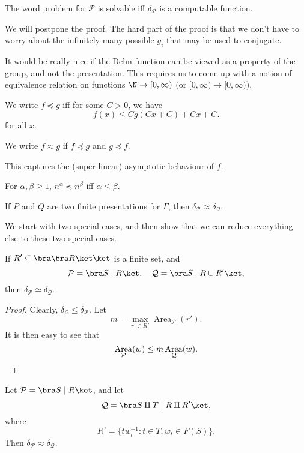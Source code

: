 \documentclass[a4paper]{article}
\DeclareMathOperator\Area{Area}
\begin{document}
\begin{prop}
  The word problem for $\mathcal{P}$ is solvable iff $\delta_{\mathcal{P}}$ is a computable function.
\end{prop}

We will postpone the proof. The hard part of the proof is that we don't have to worry about the infinitely many possible $g_i$ that may be used to conjugate.

It would be really nice if the Dehn function can be viewed as a property of the group, and not the presentation. This requires us to come up with a notion of equivalence relation on functions $\N \to [0, \infty)$ (or $[0, \infty) \to [0, \infty)$).

\begin{defi}[$\preccurlyeq$]\index{$\preccurlyeq$}
  We write $f \preccurlyeq g$ iff for some $C > 0$, we have
  \[
    f(x) \leq C g(Cx + C) + Cx + C.
  \]
  for all $x$.

  We write $f \approx g$ if $f \preccurlyeq g$ and $g \preccurlyeq f$.
\end{defi}
This captures the (super-linear) asymptotic behaviour of $f$.

\begin{eg}
  For $\alpha, \beta \geq 1$, $n^\alpha \preccurlyeq n^\beta$ iff $\alpha \leq \beta$.
\end{eg}

\begin{prop}
  If $P$ and $Q$ are two finite presentations for $\Gamma$, then $\delta_{\mathcal{P}} \approx \delta_{\mathcal{Q}}$.
\end{prop}

We start with two special cases, and then show that we can reduce everything else to these two special cases.
\begin{lemma}
  If $R' \subseteq \bra \bra R \ket \ket$ is a finite set, and
  \[
    \mathcal{P} = \bra S \mid R \ket,\quad \mathcal{Q} = \bra S \mid R \cup R'\ket,
  \]
  then $\delta_{\mathcal{P}} \simeq \delta_{\mathcal{Q}}$.
\end{lemma}

\begin{proof}
  Clearly, $\delta_{\mathcal{Q}} \leq \delta_{\mathcal{P}}$. Let
  \[
    m= \max_{r' \in R'} \Area_{\mathcal{P}}(r').
  \]
  It is then easy to see that
  \[
    \Area_{\mathcal{P}}(w) \leq m \Area_{\mathcal{Q}}(w).\qedhere
  \]
\end{proof}

\begin{lemma}
  Let $\mathcal{P} = \bra S \mid R\ket$, and let
  \[
    \mathcal{Q} = \bra S \amalg T \mid R \amalg R'\ket,
  \]
  where
  \[
    R' = \{t w_t^{-1}: t \in T, w_t \in F(S)\}.
  \]
  Then $\delta_{\mathcal{P}} \approx \delta_{\mathcal{Q}}$.
\end{lemma}
\end{document}
